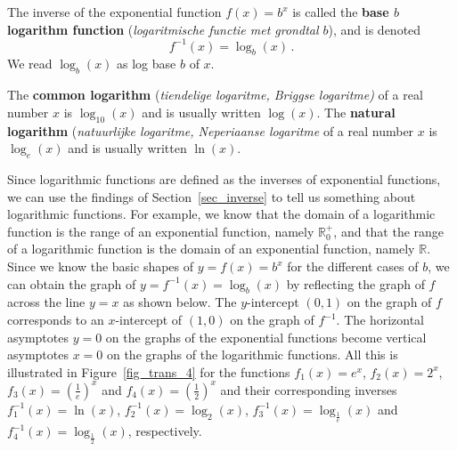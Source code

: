 \begin{definition}
 \label{logfcndefn} The inverse of the exponential function $f(x) = b^{x}$ is called the  \textbf{base  $b$ logarithm function} (\textit{logaritmische functie met grondtal $b$}), and is denoted  
$$f^{-1}(x) = \log_{b}(x)\,.$$
We read $\log_{b}(x)$ as log base $b$ of $x$. 
\end{definition}

The  \textbf{common logarithm} (\textit{tiendelige logaritme, Briggse logaritme)} of a real number $x$ is $\log_{10}(x)$ and is usually written $\log(x)$.   The  \textbf{natural logarithm} (\textit{natuurlijke logaritme, Neperiaanse logaritme} of a real number $x$ is $\log_{e}(x)$ and is usually written $\ln(x)$.  


Since logarithmic functions are defined as the inverses of exponential functions, we can use the findings of Section~\ref{sec_inverse} to tell us something about logarithmic functions.  For example, we know that the domain of a logarithmic function is the range of an exponential function, namely $\mathbb{R}^+_0$, and that the range of a logarithmic function is the domain of an exponential function, namely $\mathbb{R}$.   Since we know the basic shapes of $y = f(x) = b^{x}$ for the different cases of $b$, we can obtain the graph of $y = f^{-1}(x) = \log_{b}(x)$ by reflecting the graph of $f$ across the line $y=x$ as shown below.  The $y$-intercept $(0,1)$ on the graph of $f$  corresponds to an $x$-intercept of $(1,0)$ on the graph of $f^{-1}$.  The horizontal asymptotes $y=0$ on the graphs of the exponential functions become vertical asymptotes $x=0$ on the graphs of the logarithmic functions. All this is illustrated in Figure~\ref{fig_trans_4} for the functions $f_1(x)=e^x$, $f_2(x)=2^x$, $f_3(x)=\left(\frac{1}{e}\right)^x$ and $f_4(x)=\left(\frac{1}{2}\right)^x$ and their corresponding inverses $f_1^{-1}(x)=\ln(x)$, $f_2^{-1}(x)=\log_2(x)$, $f_3^{-1}(x)=\log_{\frac{1}{e}}(x)$ and $f_4^{-1}(x)=\log_{\frac{1}{2}}(x)$, respectively.  

